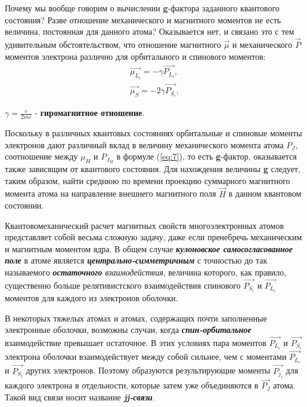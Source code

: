 Почему мы вообще говорим о вычислении \textbf{g}-фактора заданного квантового состояния? Разве отношение механического и магнитного моментов не есть величина, постоянная для данного атома? Оказывается нет, и связано это с тем удивительным 
обстоятельством, что отношение магнитного $\vec{\mu}$ и механического $\vec{P}$ моментов электрона различно для орбитального и 
спинового моментов: 
\begin{gather} 
\label{eq:12} 
\vec{\mu_{L_i}} = -\gamma \vec{P_{L_i}}, \\
\vec{\mu_{S}} = -2\gamma \vec{P_{S_i}}, 
\end{gather}

$\gamma=\frac{e}{2mc}$ - \textbf{гиромагнитное отношение}.

Поскольку в различных квантовых состояниях орбитальные и спиновые моменты электронов дают различный вклад в величину механического момента атома $P_J$, соотношение между $\mu_H$ и $P_{J_H}$  в формуле (\ref{eq:7}), то есть \textbf{g}-фактор, оказывается также зависящим от квантового состояния. Для нахождения величины \textbf{g} следует, таким образом, найти среднюю по времени проекцию суммарного магнитного момента атома на направление внешнего магнитного поля $\vec{H}$ в данном квантовом состоянии.

Квантовомеханический расчет магнитных свойств многоэлектронных атомов представляет собой весьма сложную задачу, даже если пренебречь механическим и магнитным моментом ядра. В общем случае {\itshape{\textbf{кулоновское самосогласованное поле}}} в атоме является {\itshape\textbf{центрально-симметричным}} с точностью до так называемого {\itshape\textbf{остаточного} взаимодействия}, величина которого, как правило, существенно больше релятивистского взаимодействия спинового $\vec{P_{S_i}}$ и $\vec{P_{L_i}}$ моментов для каждого из электронов оболочки.

В некоторых тяжелых атомах и атомах, содержащих почти заполненные электронные оболочки, возможны случаи, когда {\itshape\textbf{спин-орбитальное}} взаимодействие превышает остаточное. В этих условиях пара моментов $\vec{P_{L_i}}$ и $\vec{P_{S_i}}$ электрона оболочки взаимодействует между собой сильнее, чем с моментами $\vec{P_{L_i}}$ и $\vec{P_{S_i}}$ других электронов. Поэтому образуются результирующие моменты $\vec{P_{j_i}}$ для каждого электрона в отдельности, которые затем уже объединяются в $\vec{P_J}$ атома. Такой вид связи носит название {\itshape\textbf{jj-связи}}.

